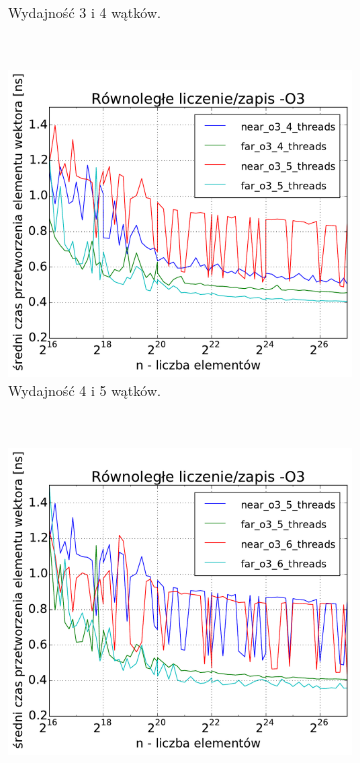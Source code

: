\begin{figure}
\begin{subfigure}[c]{0.45\textwidth}
        \caption{Wydajność 3 i 4 wątków.}
    \end{subfigure}
    \\
    \vspace{0.5cm}
    \begin{subfigure}[c]{0.45\textwidth}
        \centering
        \includegraphics[width=\textwidth]{images/benchs/parallel_count_interesting3}
        \caption{Wydajność 4 i 5 wątków.}
    \end{subfigure}
    ~
    \begin{subfigure}[c]{0.45\textwidth}
        \centering
        \includegraphics[width=\textwidth]{images/benchs/parallel_count_interesting4}

\end{subfigure}
\end{figure}
